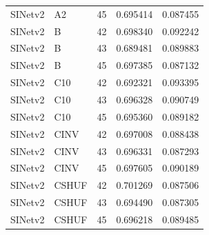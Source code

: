 \begin{table}[h]
\begin{center}
\begin{tabular}{lllcc}
SINetv2 & A2 & 45 & 0.695414 & 0.087455 \\
SINetv2 & B & 42 & 0.698340 & 0.092242 \\
SINetv2 & B & 43 & 0.689481 & 0.089883 \\
SINetv2 & B & 45 & 0.697385 & 0.087132 \\
SINetv2 & C10 & 42 & 0.692321 & 0.093395 \\
SINetv2 & C10 & 43 & 0.696328 & 0.090749 \\
SINetv2 & C10 & 45 & 0.695360 & 0.089182 \\
SINetv2 & CINV & 42 & 0.697008 & 0.088438 \\
SINetv2 & CINV & 43 & 0.696331 & 0.087293 \\
SINetv2 & CINV & 45 & 0.697605 & 0.090189 \\
SINetv2 & CSHUF & 42 & 0.701269 & 0.087506 \\
SINetv2 & CSHUF & 43 & 0.694490 & 0.087305 \\
SINetv2 & CSHUF & 45 & 0.696218 & 0.089485 \\
\bottomrule
\end{tabular}
\end{center}
\end{table}
